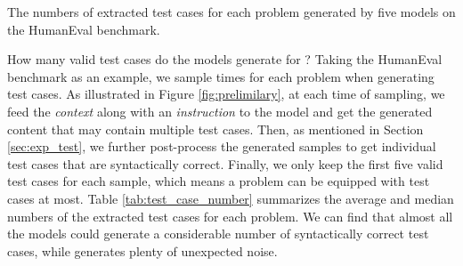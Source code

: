 \begin{table}[t]
\small
\begin{minipage}{0.48\linewidth}
\centering
    \caption{The numbers of extracted test cases for each problem generated by five models on the HumanEval benchmark.}
    \label{tab:test_case_number}
\end{minipage}
\hspace{2pt}
\begin{minipage}{0.48\linewidth}
\centering
{}
    \caption{The Code Coverage () statistics of test cases generated by five models on the HumanEval benchmark.}
    \label{tab:coverage}
\end{minipage}
\end{table}

How many valid test cases do the models generate for \ours? Taking the HumanEval benchmark as an example, we sample  times for each problem when generating test cases. As illustrated in Figure \ref{fig:prelimilary}, at each time of sampling, we feed the \emph{context}  along with an \emph{instruction}  to the model and get the generated content that may contain multiple test cases. Then, as mentioned in Section \ref{sec:exp_test}, we further post-process the generated samples to get individual test cases that are syntactically correct. Finally, we only keep the first five valid test cases for each sample, which means a problem can be equipped with  test cases at most. Table \ref{tab:test_case_number} summarizes the average and median numbers of the extracted test cases for each problem. We can find that almost all the models could generate a considerable number of syntactically correct test cases, while \codegen generates plenty of unexpected noise.

